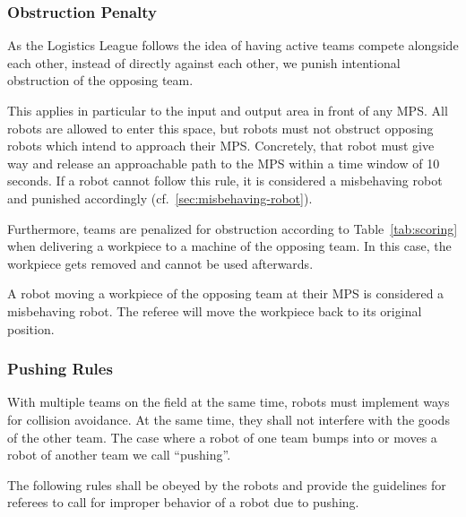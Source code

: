 \documentclass[12pt,twoside]{article}
\newcommand{\reftab}[1]{Table~\ref{#1}}
\begin{document}
\subsubsection{Obstruction Penalty}
\label{sec:obstruction-penalty}

As the Logistics League follows the idea of having active teams
compete alongside each other, instead of directly against each other, we
punish intentional obstruction of the opposing team.

This applies in particular to the input and output area in front of
any \ac{MPS}.  All robots are allowed to enter this space, but robots must
not obstruct opposing robots which intend to approach their
\ac{MPS}. Concretely, that robot must give way and release an approachable
path to the \ac{MPS} within a time window of 10 seconds. If a robot cannot
follow this rule, it is considered a misbehaving robot and punished accordingly
(cf.~\ref{sec:misbehaving-robot}).

Furthermore, teams are penalized for obstruction according to
\reftab{tab:scoring} when delivering a workpiece to a machine of the
opposing team. In this case, the workpiece gets removed and cannot be
used afterwards.

A robot moving a workpiece of the opposing team at their \ac{MPS} is
considered a misbehaving robot.
The referee will move the workpiece back to its original position.

\subsubsection{Pushing Rules}
\label{sec:pushing-rules}

With multiple teams on the field at the same time, robots must
implement ways for collision avoidance. At the same time, they shall
not interfere with the goods of the other team. The case where a robot
of one team bumps into or moves a robot of another team we
call ``pushing''.

The following rules shall be obeyed by the robots and provide the
guidelines for referees to call for improper behavior of a robot due
to pushing.
\end{document}
